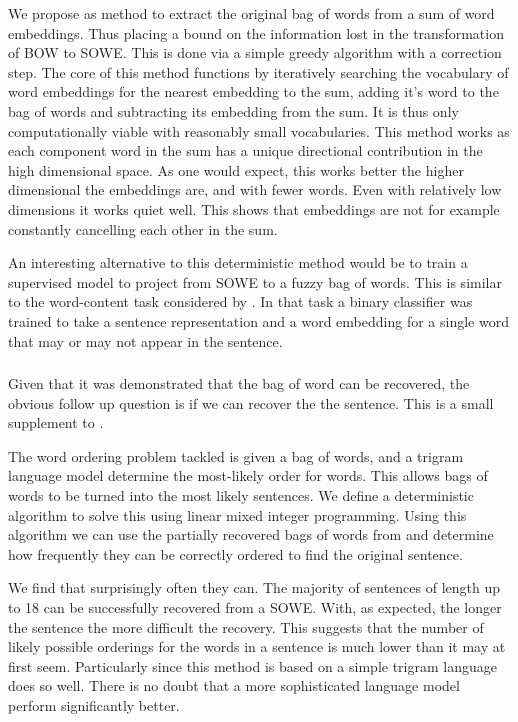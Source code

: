 \documentclass{book}
\begin{document}
We propose as method to extract the original bag of words from a sum of word embeddings. Thus placing a bound on the information lost in the transformation of BOW to SOWE. This is done via a simple greedy algorithm with a correction step.
The core of this method functions by iteratively searching the vocabulary of word embeddings for the nearest embedding to the sum,
adding it's word to the bag of words and subtracting its embedding from the sum.
It is thus only computationally viable with reasonably small vocabularies.
This method works as each component word in the sum has a unique directional contribution in the high dimensional space.
As one would expect, this works better the higher dimensional the embeddings are, and with fewer words.
Even with relatively low dimensions it works quiet well.
This shows that embeddings are not for example constantly cancelling each other in the sum.





An interesting alternative to this deterministic method would be to train a supervised model to project from SOWE to a fuzzy bag of words.
This is similar to the word-content task considered by
\citet{adi2017Probing}.
In that task a binary classifier was trained to take a sentence representation and a word embedding for a single word that may or may not appear in the sentence.


\subsubsection{ }
Given that it was demonstrated that the bag of word can be recovered,
the obvious follow up question is if we can recover the the sentence.
This  is a small supplement to .

The word ordering problem tackled is given a bag of words,
and a trigram language model determine the most-likely order for words.
This allows bags of words to be turned into the most likely sentences.
We define a deterministic algorithm to solve this using linear mixed integer programming.
Using this algorithm we can use the partially recovered bags of words from  and determine how frequently they can be correctly ordered to find the original sentence.

We find that surprisingly often they can.
The majority of sentences of length up to 18 can be successfully recovered from a SOWE.
With, as expected, the longer the sentence the more difficult the recovery.
This suggests that the number of likely possible orderings for the words in a sentence is much lower than it may at first seem.
Particularly since this method is based on a simple trigram language does so well.
There is no doubt that a more sophisticated language model perform significantly better.
\end{document}

